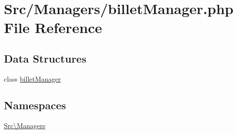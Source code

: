 \hypertarget{billet_manager_8php}{}\section{Src/\+Managers/billet\+Manager.php File Reference}
\label{billet_manager_8php}
\subsection*{Data Structures}
\begin{DoxyCompactItemize}
\item 
class \hyperlink{class_src_1_1_managers_1_1billet_manager}{billet\+Manager}
\end{DoxyCompactItemize}
\subsection*{Namespaces}
\begin{DoxyCompactItemize}
\item 
 \hyperlink{namespace_src_1_1_managers}{Src\textbackslash{}\+Managers}
\end{DoxyCompactItemize}
